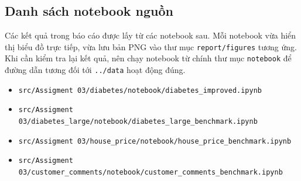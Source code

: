 \documentclass[12pt,a4paper]{report}
\newcommand{\modelpath}[1]{\texttt{#1}}
\begin{document}
\begin{table}[H]
\centering
\caption{Checklist tái lập thực nghiệm}
\label{tab:reproducibility_checklist}
\end{table}

\subsection{Danh sách notebook nguồn}
Các kết quả trong báo cáo được lấy từ các notebook sau.
Mỗi notebook vừa hiển thị biểu đồ trực tiếp, vừa lưu bản PNG vào thư mục \modelpath{report/figures} tương ứng.
Khi cần kiểm tra lại kết quả, nên chạy notebook từ chính thư mục \modelpath{notebook} để đường dẫn tương đối tới \modelpath{../data} hoạt động đúng.

\begin{itemize}
    \item \modelpath{src/Assigment 03/diabetes/notebook/diabetes\_improved.ipynb}
    \item \modelpath{src/Assigment 03/diabetes\_large/notebook/diabetes\_large\_benchmark.ipynb}
    \item \modelpath{src/Assigment 03/house\_price/notebook/house\_price\_benchmark.ipynb}
    \item \modelpath{src/Assigment 03/customer\_comments/notebook/customer\_comments\_benchmark.ipynb}
\end{itemize}
\end{document}
